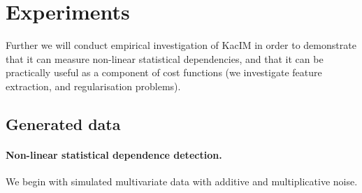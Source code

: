 \documentclass{article}
\begin{document}



\section{Experiments}
\label{section:experiments}

Further we will conduct empirical investigation of KacIM in order to demonstrate that it can measure non-linear statistical dependencies, and that it can be practically useful as a component of cost functions (we investigate feature extraction, and regularisation problems).

\subsection{Generated data}

\paragraph{Non-linear statistical dependence detection.} We begin with simulated multivariate data with additive and multiplicative noise.
\end{document}
